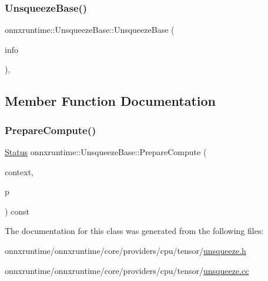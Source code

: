 \subsubsection{\texorpdfstring{Unsqueeze\+Base()}{UnsqueezeBase()}}
{\footnotesize\ttfamily onnxruntime\+::\+Unsqueeze\+Base\+::\+Unsqueeze\+Base (\begin{DoxyParamCaption}\item[{const \mbox{\hyperlink{classonnxruntime_1_1OpKernelInfo}{Op\+Kernel\+Info}} \&}]{info }\end{DoxyParamCaption})\hspace{0.3cm}{\ttfamily [inline]}, {\ttfamily [protected]}}



\subsection{Member Function Documentation}
\mbox{\label{classonnxruntime_1_1UnsqueezeBase_a36e6bc9ed11b67f57f26c681dabf3c5b}} 
\subsubsection{\texorpdfstring{Prepare\+Compute()}{PrepareCompute()}}
{\footnotesize\ttfamily \mbox{\hyperlink{classonnxruntime_1_1common_1_1Status}{Status}} onnxruntime\+::\+Unsqueeze\+Base\+::\+Prepare\+Compute (\begin{DoxyParamCaption}\item[{\mbox{\hyperlink{classonnxruntime_1_1OpKernelContext}{Op\+Kernel\+Context}} $\ast$}]{context,  }\item[{\mbox{\hyperlink{structonnxruntime_1_1UnsqueezeBase_1_1Prepare}{Prepare}} \&}]{p }\end{DoxyParamCaption}) const\hspace{0.3cm}{\ttfamily [protected]}}



The documentation for this class was generated from the following files\+:\begin{DoxyCompactItemize}
\item 
onnxruntime/onnxruntime/core/providers/cpu/tensor/\mbox{\hyperlink{cpu_2tensor_2unsqueeze_8h}{unsqueeze.\+h}}\item 
onnxruntime/onnxruntime/core/providers/cpu/tensor/\mbox{\hyperlink{cpu_2tensor_2unsqueeze_8cc}{unsqueeze.\+cc}}\end{DoxyCompactItemize}
